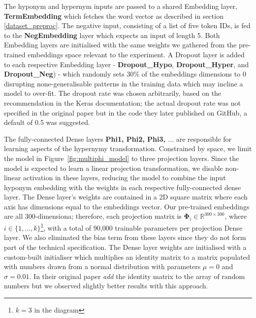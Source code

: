 The hyponym and hypernym inputs are passed to a shared Embedding layer, \textbf{TermEmbedding} which fetches the word vector as described in section \ref{dataset_preproc}.  The negative input, consisting of a list of five token IDs, is fed to the \textbf{NegEmbedding} layer which expects an input of length 5.  Both Embedding layers are initialised with the same weights we gathered from the pre-trained embeddings space relevant to the experiment.  A Dropout layer is added to each respective Embedding layer - \textbf{Dropout\_Hypo}, \textbf{Dropout\_Hyper}, and \textbf{Dropout\_Neg}) - which randomly sets 30\% of the embeddings dimensions to 0 disrupting none-generalisable patterns in the training data which may incline a model to over-fit.  The dropout rate was chosen arbitrarily, based on the recommendation in the Keras documentation; the actual dropout rate was not specified in the original paper \citep{bernier2018crim} but in the code they later published on GitHub, a default of 0.5 was suggested.

The fully-connected Dense layers \textbf{Phi1, Phi2, Phi3, $\ldots$} are responsible for learning aspects of the hypernymy transformation.  Constrained by space, we limit the model in Figure~\ref{fig:multiphi_model} to  three projection layers.  Since the model is expected to learn a linear projection transformation, we disable non-linear activation in these layers, reducing the model to combine the input hyponym embedding with the weights in each respective fully-connected dense layer.  The Dense layer's weights are contained in a 2D square matrix where each axis has dimensions equal to the embeddings vector.  Our pre-trained embeddings are all 300-dimensiona; therefore, each projection matrix is $\bm{\Phi}_i \in \mathbb{R}^{300 \times 300}$, where $i \in \{1,\ldots,k\}$\footnote{$k=3$ in the diagram}, with a total of 90,000 trainable parameters per projection Dense layer.  We also eliminated the bias term from these layers since they do not form part of the technical specification.  The Dense layer weights are initialised with a custom-built initialiser which multiplies an identity matrix to a matrix populated with numbers drawn from a normal distribution with parameters $\mu=0$ and $\sigma=0.01$.  In their original paper \citet{bernier2018crim} \textit{add} the identity matrix to the array of random numbers but we observed slightly better results with this approach.

